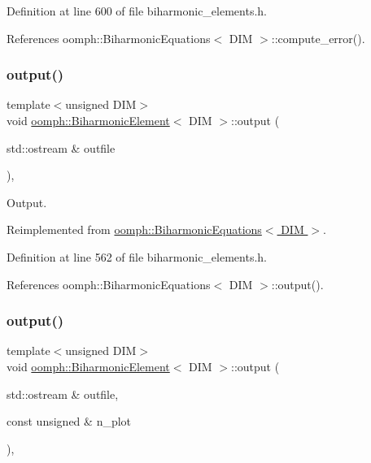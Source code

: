 Definition at line 600 of file biharmonic\+\_\+elements.\+h.



References oomph\+::\+Biharmonic\+Equations$<$ D\+I\+M $>$\+::compute\+\_\+error().

\mbox{\label{classoomph_1_1BiharmonicElement_a03e56665ab48baab03924992830976c6}} 
\subsubsection{\texorpdfstring{output()}{output()}\hspace{0.1cm}{\footnotesize\ttfamily [1/4]}}
{\footnotesize\ttfamily template$<$unsigned D\+IM$>$ \\
void \hyperlink{classoomph_1_1BiharmonicElement}{oomph\+::\+Biharmonic\+Element}$<$ D\+IM $>$\+::output (\begin{DoxyParamCaption}\item[{std\+::ostream \&}]{outfile }\end{DoxyParamCaption})\hspace{0.3cm}{\ttfamily [inline]}, {\ttfamily [virtual]}}



Output. 



Reimplemented from \hyperlink{classoomph_1_1BiharmonicEquations_a2e34f7e115f4e80d5ef6fcbed78c97d7}{oomph\+::\+Biharmonic\+Equations$<$ D\+I\+M $>$}.



Definition at line 562 of file biharmonic\+\_\+elements.\+h.



References oomph\+::\+Biharmonic\+Equations$<$ D\+I\+M $>$\+::output().

\mbox{\label{classoomph_1_1BiharmonicElement_ae21ebdb90932f2643157d2949093ea78}} 
\subsubsection{\texorpdfstring{output()}{output()}\hspace{0.1cm}{\footnotesize\ttfamily [2/4]}}
{\footnotesize\ttfamily template$<$unsigned D\+IM$>$ \\
void \hyperlink{classoomph_1_1BiharmonicElement}{oomph\+::\+Biharmonic\+Element}$<$ D\+IM $>$\+::output (\begin{DoxyParamCaption}\item[{std\+::ostream \&}]{outfile,  }\item[{const unsigned \&}]{n\+\_\+plot }\end{DoxyParamCaption})\hspace{0.3cm}{\ttfamily [inline]}, {\ttfamily [virtual]}}



